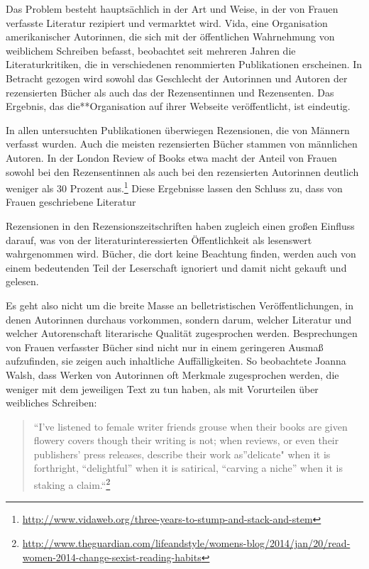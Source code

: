 \documentclass[a4paper,
fontsize=11pt,
oneside,
numbers=noperiodatend,
parskip=half-,
bibliography=totoc,
final
]{scrartcl}
\begin{document}
Das Problem besteht hauptsächlich in der Art und Weise, in der von
Frauen verfasste Literatur rezipiert und vermarktet wird. Vida, eine
Organisation amerikanischer Autorinnen, die sich mit der öffentlichen
Wahrnehmung von weiblichem Schreiben befasst, beobachtet seit mehreren
Jahren die Literaturkritiken, die in verschiedenen renommierten
Publikationen erscheinen. In Betracht gezogen wird sowohl das Geschlecht
der Autorinnen und Autoren der rezensierten Bücher als auch das der
Rezensentinnen und Rezensenten. Das Ergebnis, das die**Organisation auf
ihrer Webseite veröffentlicht, ist eindeutig.~

In allen untersuchten Publikationen überwiegen Rezensionen, die von
Männern verfasst wurden. Auch die meisten rezensierten Bücher stammen
von männlichen Autoren. In der London Review of Books etwa macht der
Anteil von Frauen sowohl bei den Rezensentinnen als auch bei den
rezensierten Autorinnen deutlich weniger als 30 Prozent aus.\footnote{\url{http://www.vidaweb.org/three-years-to-stump-and-stack-and-stem}}
Diese Ergebnisse lassen den Schluss zu, dass von Frauen geschriebene
Literatur

Rezensionen in den Rezensionszeitschriften haben zugleich einen großen
Einfluss darauf, was von der literaturinteressierten Öffentlichkeit als
lesenswert wahrgenommen wird. Bücher, die dort keine Beachtung finden,
werden auch von einem bedeutenden Teil der Leserschaft ignoriert und
damit nicht gekauft und gelesen.~

Es geht also nicht um die breite Masse an belletristischen
Veröffentlichungen, in denen Autorinnen durchaus vorkommen, sondern
darum, welcher Literatur und welcher Autorenschaft literarische Qualität
zugesprochen werden. Besprechungen von Frauen verfasster Bücher sind
nicht nur in einem geringeren Ausmaß aufzufinden, sie zeigen auch
inhaltliche Auffälligkeiten. So beobachtete Joanna Walsh, dass Werken
von Autorinnen oft Merkmale zugesprochen werden, die weniger mit dem
jeweiligen Text zu tun haben, als mit Vorurteilen über weibliches
Schreiben:

\begin{quote}
\enquote{I've listened to female writer friends grouse when their books
are given flowery covers though their writing is not; when reviews, or
even their publishers' press releases, describe their work as}delicate"
when it is forthright, \enquote{delightful} when it is satirical,
\enquote{carving a niche} when it is staking a claim.``\footnote{\url{http://www.theguardian.com/lifeandstyle/womens-blog/2014/jan/20/read-women-2014-change-sexist-reading-habits}}
\end{quote}
\end{document}
